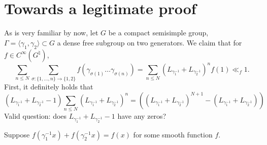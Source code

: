 \documentclass{article}
\begin{document}
\section{Towards a legitimate proof}

As is very familiar by now, let $G$ be a compact semisimple group, 
$\Gamma=\langle \gamma_1,\gamma_2\rangle\subset G$ a dense free subgroup on 
two generators. We claim that for $f\in C^\infty(G^\natural)$, 
\[
	\sum_{n\leqslant N} \sum_{\sigma\colon \{1,\dots,n\} \to \{1,2\}} f(\gamma_{\sigma(1)} \dots \gamma_{\sigma(n)}) = \sum_{n\leqslant N} (L_{\gamma_1^{-1}} + L_{\gamma_2^{-1}})^n f (1) \ll_f 1 .
\]
First, it definitely holds that 
\[
	(L_{\gamma_1^{-1}} + L_{\gamma_2^{-1}} - 1) \sum_{n\leqslant N} (L_{\gamma_1^{-1}} + L_{\gamma_2^{-1}})^n = ((L_{\gamma_1^{-1}} + L_{\gamma_2^{-1}})^{N+1} - (L_{\gamma_1^{-1}} + L_{\gamma_2^{-1}}))
\]
Valid question: does $L_{\gamma_1^{-1}} + L_{\gamma_2^{-1}} - 1$ have any 
zeros? 

Suppose $f(\gamma_1^{-1} x) + f(\gamma_2^{-1} x) = f(x)$ for some smooth 
function $f$. 
\end{document}
